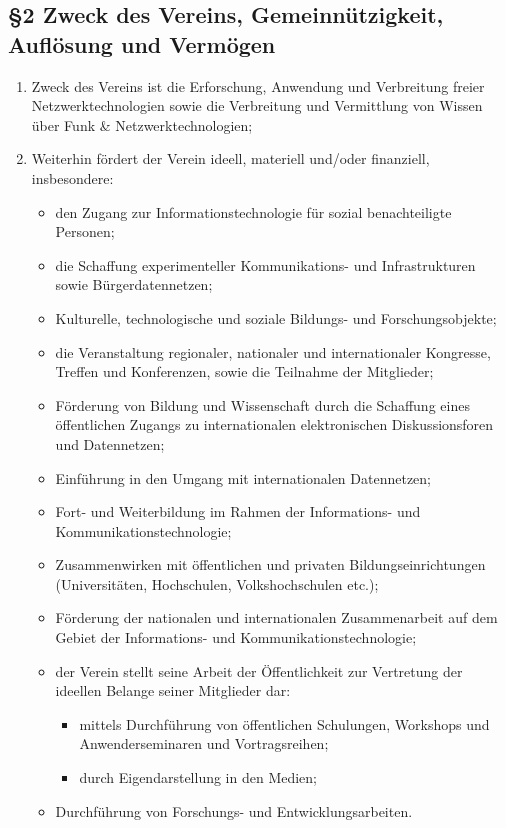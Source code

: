 \documentclass[12pt,a4paper]{article}
\begin{document}
\subsection*{§2 Zweck des Vereins, Gemeinnützigkeit, Auflösung und Vermögen}
\begin{enumerate}
\item Zweck des Vereins ist die Erforschung, Anwendung und Verbreitung freier Netzwerktechnologien sowie die Verbreitung und Vermittlung von Wissen über Funk \& Netzwerktechnologien;
\item Weiterhin fördert der Verein ideell, materiell und/oder finanziell, insbesondere:
\begin{itemize}
\item den Zugang zur Informationstechnologie für sozial benachteiligte Personen;
\item die Schaffung experimenteller Kommunikations- und Infrastrukturen sowie Bürgerdatennetzen;
\item Kulturelle, technologische und soziale Bildungs- und Forschungsobjekte;
\item die Veranstaltung regionaler, nationaler und internationaler Kongresse, Treffen und Konferenzen, sowie die Teilnahme der Mitglieder;
\item Förderung von Bildung und Wissenschaft durch die Schaffung eines öffentlichen Zugangs zu internationalen elektronischen Diskussionsforen und Datennetzen;
\item Einführung in den Umgang mit internationalen Datennetzen;
\item Fort- und Weiterbildung im Rahmen der Informations- und Kommunikationstechnologie;
\item Zusammenwirken mit öffentlichen und privaten Bildungseinrichtungen (Universitäten, Hochschulen, Volkshochschulen etc.);
\item Förderung der nationalen und internationalen Zusammenarbeit auf dem Gebiet der Informations- und Kommunikationstechnologie;
\item der Verein stellt seine Arbeit der Öffentlichkeit zur Vertretung der ideellen Belange seiner Mitglieder dar:
\begin{itemize}
\item mittels Durchführung von öffentlichen Schulungen, Workshops und Anwenderseminaren und Vortragsreihen;
\item durch Eigendarstellung in den Medien;
\end{itemize}
\item Durchführung von Forschungs- und Entwicklungsarbeiten.

\end{itemize}
\end{enumerate}
\end{document}
